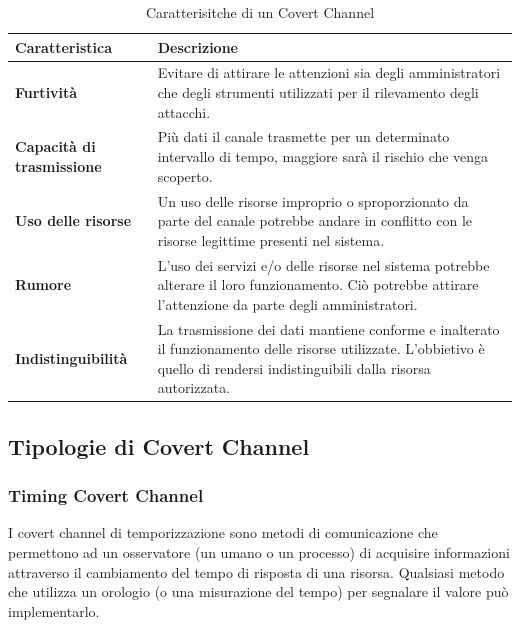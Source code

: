 \begin{center} 
\begin{longtable}{|p{}|p{}|} 
\caption{Caratterisitche di un Covert Channel} 
\label{tabella:caratteristiche:covert:channel} \\
    \hline
    \textbf{Caratteristica} & \textbf{Descrizione} \\
    \hline
    \textbf{Furtività} & 
        Evitare di attirare le attenzioni sia degli amministratori che degli strumenti utilizzati per il rilevamento degli attacchi. 
    \\
    \hline 
    \textbf{Capacità di trasmissione} & 
        Più dati il canale trasmette per un determinato intervallo di tempo, 
        maggiore sarà il rischio che venga scoperto.   
    \\
    \hline
    \textbf{Uso delle risorse} &
        Un uso delle risorse improprio o sproporzionato 
        da parte del canale potrebbe andare in conflitto con le risorse legittime presenti nel sistema. 
    \\
    \hline
    \textbf{Rumore} &
        L'uso dei servizi e/o delle risorse nel sistema potrebbe alterare il loro funzionamento. 
        Ciò potrebbe attirare l'attenzione da parte degli amministratori. 
    \\
    \hline
    \textbf{Indistinguibilità} & 
        La trasmissione dei dati mantiene conforme e inalterato il funzionamento delle risorse utilizzate. 
        L'obbietivo è quello di rendersi indistinguibili dalla risorsa autorizzata. 
    \\ 
    \hline
\end{longtable} 
\end{center} 


\subsection{Tipologie di Covert Channel}

\subsubsection{Timing Covert Channel}
I covert channel di temporizzazione sono metodi di comunicazione che permettono ad un osservatore (un umano o un processo) 
di acquisire informazioni attraverso il cambiamento del tempo di risposta di una risorsa.  
Qualsiasi metodo che utilizza un orologio (o una misurazione del tempo) per segnalare il valore può implementarlo. 


